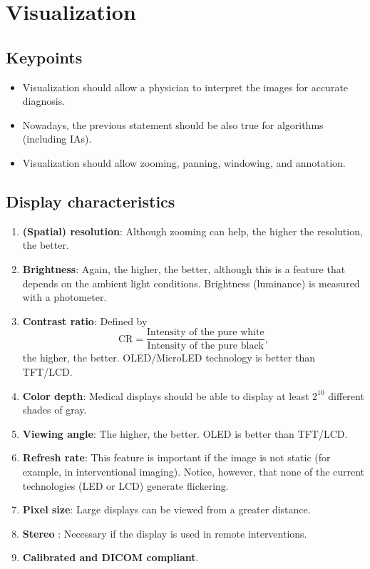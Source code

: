 \chapter{Visualization}

\section{Keypoints}
\begin{itemize}
\item Visualization should allow a physician to interpret the
  images for accurate diagnosis.
\item Nowadays, the previous statement should be also true for
  algorithms (including IAs).
\item Visualization should allow zooming, panning, windowing, and
  annotation.
\end{itemize}

\section{Display characteristics}
\begin{enumerate}
\item \textbf{(Spatial) resolution}: Although zooming can help, the
  higher the resolution, the better.
\item \textbf{Brightness}: Again, the higher, the better, although
  this is a feature that depends on the ambient light
  conditions. Brightness (luminance) is measured with a photometer.
\item \textbf{Contrast ratio}: Defined by
  \begin{equation}
    \text{CR} = \frac{\text{Intensity~of~the~pure~white}}{\text{Intensity~of~the~pure~black}},
  \end{equation}
  the higher, the better. OLED/MicroLED technology is better than TFT/LCD.
\item \textbf{Color depth}: Medical displays should be able to display
  at least $2^{10}$ different shades of gray.
\item \textbf{Viewing angle}: The higher, the better. OLED is better than TFT/LCD. 
\item \textbf{Refresh rate}: This feature is important if the image is
  not static (for example, in interventional imaging). Notice,
  however, that none of the current technologies (LED or LCD) generate
  flickering.
\item \textbf{Pixel size}: Large displays can be viewed from a greater distance.
\item \textbf{Stereo} \cite{wikipedia_stereoscopy}: Necessary if the
  display is used in remote interventions.
\item \textbf{Calibrated and DICOM compliant}.
\end{enumerate}


